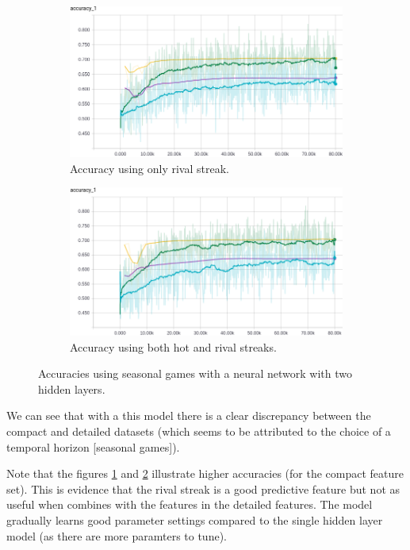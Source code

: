 \documentclass{article} %
\begin{document}
\begin{figure}[!htb]
  \begin{subfigure}{0.5\textwidth}
    \includegraphics[width=\linewidth]{plots/model2/streak-r/accuracy.png}
    \caption{Accuracy using only rival streak.}\label{fig:model2-r-accuracy}
  \end{subfigure}
  \begin{subfigure}{0.5\textwidth}
    \includegraphics[width=\linewidth]{plots/model2/streak-hr/accuracy.png}
    \caption{Accuracy using both hot and rival streaks.}\label{fig:model2-hr-accuracy}
  \end{subfigure}
  \caption{Accuracies using seasonal games with a neural network with two hidden layers.}
  \label{fig:model2-accuracies}
\end{figure}

We can see that with a this model there is a clear discrepancy between the compact and detailed datasets (which seems to be attributed to the choice of a temporal horizon [seasonal games]).

Note that the figures \ref{fig:model2-r-accuracy} and \ref{fig:model2-hr-accuracy} illustrate higher accuracies (for the compact feature set).
This is evidence that the rival streak is a good predictive feature but not as useful when combines with the features in the detailed features.
The model gradually learns good parameter settings compared to the single hidden layer model (as there are more paramters to tune).
\end{document}
